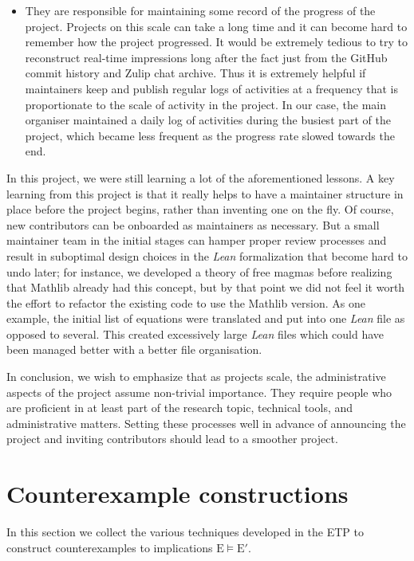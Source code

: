 \documentclass[12pt]{amsart}
\theoremstyle{definition}
\newcommand{\E}{\mathrm{E}}
\begin{document}
\begin{itemize}
    \item They are responsible for maintaining some record of the progress of the project. Projects on this scale can take a long time and it can become hard to remember how the project progressed. It would be extremely tedious to try to reconstruct real-time impressions long after the fact just from the GitHub commit history and Zulip chat archive. Thus it is extremely helpful if maintainers keep and publish regular logs of activities at a frequency that is proportionate to the scale of activity in the project.  In our case, the main organiser maintained a daily log of activities during the busiest part of the project, which became less frequent as the progress rate slowed towards the end.
\end{itemize}

In this project, we were still learning a lot of the aforementioned lessons. A key learning from this project is that it really helps to have a maintainer structure in place before the project begins, rather than inventing one on the fly. Of course, new contributors can be onboarded as maintainers as necessary. But a small maintainer team in the initial stages can hamper proper review processes and result in suboptimal design choices in the  \emph{Lean} formalization that become hard to undo later; for instance, we developed a theory of free magmas before realizing that Mathlib already had this concept, but by that point we did not feel it worth the effort to refactor the existing code to use the Mathlib version. As one example, the initial list of equations were translated and put into one  \emph{Lean} file as opposed to several. This created excessively large  \emph{Lean} files which could have been managed better with a better file organisation.

In conclusion, we wish to emphasize that as projects scale, the administrative aspects of the project assume non-trivial importance. They require people who are proficient in at least part of the research topic, technical tools, and administrative matters. Setting these processes well in advance of announcing the project and inviting contributors should lead to a smoother project.


\section{Counterexample constructions}

In this section we collect the various techniques developed in the ETP to construct counterexamples to implications $\E \models {\E'}$.
\end{document}
